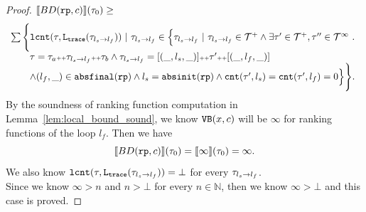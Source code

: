 \begin{proof}
$ \llbracket BD(\mathtt{rp}, c) \rrbracket(\mathtt{\tau}_0)
\geq
$
\[
  \begin{array}{l}
    \sum\Bigg\{
      \mathtt{lcnt}(\mathtt{\tau}, \mathtt{L}_{\mathtt{{trace}}}(\mathtt{\tau}_{l_s \to l_f})) ~\vert~ \mathtt{\tau}_{l_s \to l_f} \in 
    \Big\{\mathtt{\tau}_{l_s \to l_f} 
    ~\vert~ \mathtt{\tau}_{l_s \to l_f}\in \mathcal{T}^{+} 
    \land \exists  \mathtt{\tau}' \in \mathcal{T}^{+}, \mathtt{\tau}''\in \mathcal{T}^{\infty}
    ~.~ 
    \\ \qquad
    \mathtt{\tau} = \mathtt{\tau}_a {\scriptscriptstyle ++} \mathtt{\tau}_{l_s \to l_f} {\scriptscriptstyle ++} \mathtt{\tau}_b
    \land \mathtt{\tau}_{l_s \to l_f} = [(\_, l_s, \_)] {\scriptscriptstyle ++} \mathtt{\tau}' {\scriptscriptstyle ++} [(\_, l_f, \_)]
    \\ \qquad
  \land (l_{f}, \_) \in \mathtt{abs}{\mathtt{final}}(\mathtt{rp})
  \land l_s = \mathtt{abs}{\mathtt{init}}(\mathtt{rp})
  \land \mathtt{cnt}(\mathtt{\tau}', l_s) = \mathtt{cnt}(\mathtt{\tau}', l_f) = 0 
  \Big\}
  \Bigg\}.
  \end{array}
\]
By the soundness of ranking function computation in Lemma~\ref{lem:local_bound_sound}, we know ${\mathtt{VB}}(x, c)$ will be $\infty$ for ranking functions of the loop $l_f$.
Then we have 
\[
  \llbracket BD(\mathtt{rp}, c) \rrbracket(\mathtt{\tau}_0) = \llbracket \infty \rrbracket(\mathtt{\tau}_0) = \infty.
\]
We also know $\mathtt{lcnt}(\mathtt{\tau}, \mathtt{L}_{\mathtt{{trace}}}(\mathtt{\tau}_{l_s \to l_f})) = \bot$ for every $\mathtt{\tau}_{l_s \to l_f}$.
\\
Since we know $\infty > n$ and $ n > \bot$ for every $n \in \mathbb{N}$, then we know  $\infty > \bot$ and this case is proved.
\end{proof}